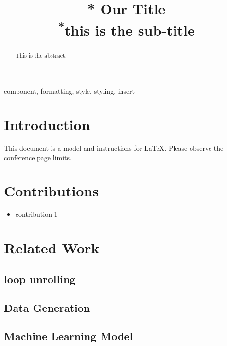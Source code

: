 \documentclass[conference]{IEEEtran}
\begin{document}
	
	\title{* Our Title\\
		{\footnotesize \textsuperscript{*}this is the sub-title}
	}
	
	\author{
	}
	
	\maketitle
	
	\begin{abstract}
		This is the abstract.
	\end{abstract}
	
	\begin{IEEEkeywords}
		component, formatting, style, styling, insert
	\end{IEEEkeywords}
	
	\section{Introduction}
	This document is a model and instructions for \LaTeX.
	Please observe the conference page limits. 
	
	\section{Contributions}
	\begin{itemize}
		\item contribution 1
	\end{itemize}

	\section{Related Work}
	\subsection{loop unrolling}
	\subsection{Data Generation}
	\subsection{Machine Learning Model}
	
\end{document}
